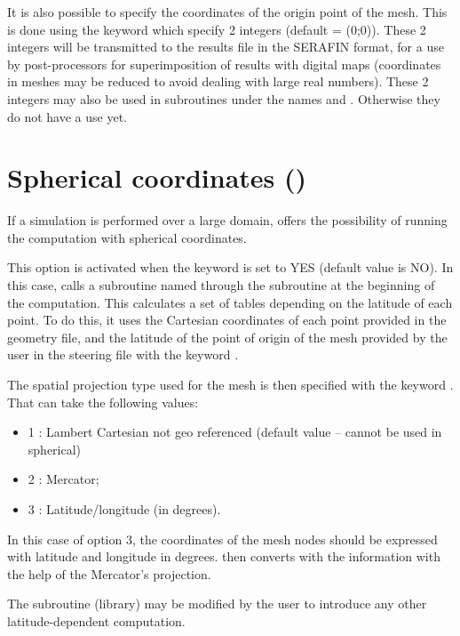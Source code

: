 It is also possible to specify the coordinates of the origin point of the mesh.
This is done using the keyword  which specify 2
integers (default = (0;0)).
These 2 integers will be transmitted to the results file in the
SERAFIN format, for a use by post-processors for superimposition of results
with digital maps (coordinates in meshes may be reduced to avoid dealing with
large real numbers). These 2 integers may also be used in subroutines under the
names  and . Otherwise they do not have a use yet.


\section{Spherical coordinates ()}

If a simulation is performed over a large domain,  offers the
possibility of running the computation with spherical coordinates.

This option is activated when the keyword  is set
to YES (default value is NO). In this case,  calls a subroutine named
 through the subroutine  at the beginning of the
computation. This calculates a set of tables depending on the latitude of each
point. To do this, it uses the Cartesian coordinates of each point provided in
the geometry file, and the latitude of the point of origin of the mesh provided
by the user in the steering file with the keyword
.

The spatial projection type used for the mesh is then specified with the
keyword . That can take the following values:
\begin{itemize}
\item 1 : Lambert Cartesian not geo referenced (default value -- cannot be used
in spherical)

\item 2 : Mercator;

\item 3 : Latitude/longitude (in degrees).
\end{itemize}

In this case of option 3, the coordinates of the mesh nodes should be
expressed with latitude and longitude in degrees.  then converts with
the information with the help of the Mercator's projection.

The  subroutine (\bief library) may be modified by the user to introduce
any other latitude-dependent computation.



